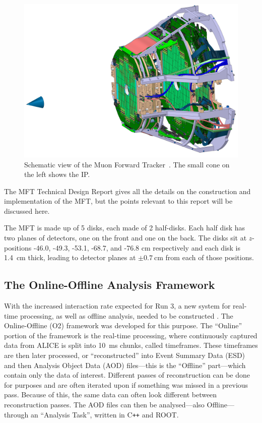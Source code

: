 \begin{figure}[h]
    \begin{center}
        \includegraphics[width=.8\textwidth]{Figs/MFT_schematic.jpg}
        \caption{Schematic view of the Muon Forward Tracker~\cite{MFT_Schematic}. The small cone on the left shows the IP.}
        \label{fig:MFT Schematic}
    \end{center}
\end{figure}

The MFT Technical Design Report \cite{MFT_TDR} gives all the details on the construction and implementation of the MFT, but the points relevant to this report will be discussed here.

The MFT is made up of 5 disks, each made of 2 half-disks. Each half disk has two planes of detectors, one on the front and one on the back. The disks sit at $z$-positions -46.0, -49.3, -53.1, -68.7, and -76.8 \si{\centi\metre} respectively and each disk is \SI{1.4}{\centi\metre} thick, leading to detector planes at $\pm \SI{0.7}{\centi\metre}$ from each of those positions. 


\subsection{The Online-Offline Analysis Framework}
With the increased interaction rate expected for Run 3, a new system for real-time processing, as well as offline analysis, needed to be constructed \cite{ALICE_Upgrade_LOI}. The Online-Offline (O2) framework was developed for this purpose. The ``Online'' portion of the framework is the real-time processing, where continuously captured data from ALICE is split into \SI{10}{\milli\second} chunks, called timeframes. These timeframes are then later processed, or ``reconstructed'' into Event Summary Data (ESD) and then Analysis Object Data (AOD) files---this is the ``Offline'' part---which contain only the data of interest. Different passes of reconstruction can be done for purposes and are often iterated upon if something was missed in a previous pass. Because of this, the same data can often look different between reconstruction passes. The AOD files can then be analysed---also Offline---through an ``Analysis Task'', written in C\texttt{++} and ROOT. 

